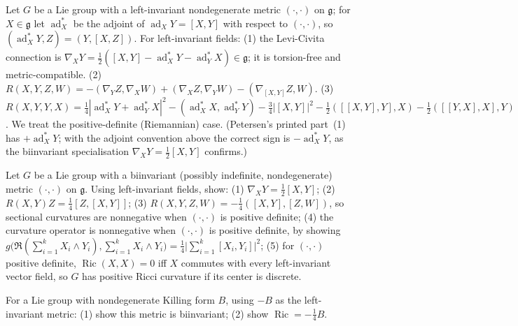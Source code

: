 \begin{remark}
  \label{rem:pet-ch3-ex-31}


  Let $G$ be a Lie group with a left-invariant nondegenerate metric
  $(\cdot,\cdot)$ on $\mathfrak g$; for $X\in\mathfrak g$ let
  $\operatorname{ad}_X^*$ be the adjoint of $\operatorname{ad}_XY=[X,Y]$ with
  respect to $(\cdot,\cdot)$, so $(\operatorname{ad}_X^*Y,Z)=(Y,[X,Z])$. For
  left-invariant fields:
  (1) the Levi-Civita connection is
  $\nabla_XY=\tfrac12([X,Y]-\operatorname{ad}_X^*Y-\operatorname{ad}_Y^*X)\in\mathfrak g$;
  it is torsion-free and metric-compatible.
  (2) $R(X,Y,Z,W)=-(\nabla_YZ,\nabla_XW)+(\nabla_XZ,\nabla_YW)-(\nabla_{[X,Y]}Z,W)$.
  (3)
  $R(X,Y,Y,X)=\tfrac14|\operatorname{ad}_X^*Y+\operatorname{ad}_Y^*X|^2-(\operatorname{ad}_X^*X,\operatorname{ad}_Y^*Y)-\tfrac34|[X,Y]|^2-\tfrac12([[X,Y],Y],X)-\tfrac12([[Y,X],X],Y)$.
  We treat the positive-definite (Riemannian) case. (Petersen's printed part~(1)
  has $+\operatorname{ad}_X^*Y$; with the adjoint convention above the correct
  sign is $-\operatorname{ad}_X^*Y$, as the biinvariant specialisation
  $\nabla_XY=\tfrac12[X,Y]$ confirms.)
\end{remark}

\begin{remark}
  \label{rem:pet-ch3-ex-32}

  Let $G$ be a Lie group with a biinvariant (possibly indefinite, nondegenerate)
  metric $(\cdot,\cdot)$ on $\mathfrak g$. Using left-invariant fields, show: (1)
  $\nabla_XY=\tfrac12[X,Y]$; (2) $R(X,Y)Z=\tfrac14[Z,[X,Y]]$; (3)
  $R(X,Y,Z,W)=-\tfrac14([X,Y],[Z,W])$, so sectional curvatures are nonnegative
  when $(\cdot,\cdot)$ is positive definite; (4) the curvature operator is
  nonnegative when $(\cdot,\cdot)$ is positive definite, by showing
  $g\big(\mathfrak R(\sum_{i=1}^kX_i\wedge Y_i),\sum_{i=1}^kX_i\wedge
  Y_i\big)=\tfrac14\big|\sum_{i=1}^k[X_i,Y_i]\big|^2$; (5) for
  $(\cdot,\cdot)$ positive
  definite, $\operatorname{Ric}(X,X)=0$ iff $X$ commutes with every left-invariant
  vector field, so $G$ has positive Ricci curvature if its center is discrete.
\end{remark}

\begin{remark}
  \label{rem:pet-ch3-ex-33}


  For a Lie group with nondegenerate Killing form $B$, using $-B$ as the
  left-invariant metric: (1) show this metric is biinvariant; (2) show
  $\operatorname{Ric}=-\tfrac14B$.
\end{remark}

